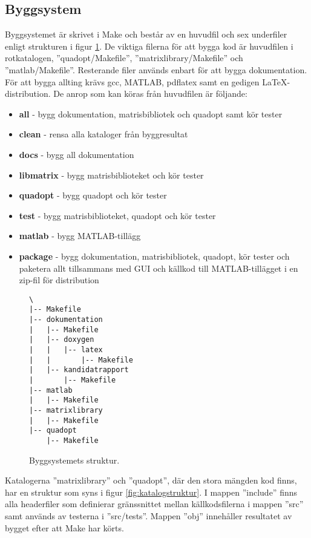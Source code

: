 \subsection{Byggsystem}
Byggsystemet är skrivet i Make och består av en huvudfil och sex underfiler enligt strukturen i figur \ref{fig:byggsystem}. De viktiga filerna för att bygga kod är huvudfilen i rotkatalogen, ''quadopt/Makefile'', ''matrixlibrary/Makefile'' och ''matlab/Makefile''. Resterande filer används enbart för att bygga dokumentation. För att bygga allting krävs gcc, MATLAB, pdflatex samt en gedigen \LaTeX-distribution.
\newline
\newline
De anrop som kan köras från huvudfilen är följande:
\begin{itemize}
  \item \textbf{all} - bygg dokumentation, matrisbibliotek och quadopt samt kör tester
  \item \textbf{clean} - rensa alla kataloger från byggresultat
  \item \textbf{docs} - bygg all dokumentation
  \item \textbf{libmatrix} - bygg matrisbiblioteket och kör tester
  \item \textbf{quadopt} - bygg quadopt och kör tester
  \item \textbf{test} - bygg matrisbiblioteket, quadopt och kör tester
  \item \textbf{matlab} - bygg MATLAB-tillägg
  \item \textbf{package} - bygg dokumentation, matrisbibliotek, quadopt, kör tester och paketera allt tillsammans med GUI och källkod till MATLAB-tillägget i en zip-fil för distribution
\end{itemize}

\begin{figure}[H]
  \centering
  \begin{verbatim}
\
|-- Makefile
|-- dokumentation
|   |-- Makefile
|   |-- doxygen
|   |   |-- latex
|   |       |-- Makefile
|   |-- kandidatrapport
|       |-- Makefile
|-- matlab
|   |-- Makefile
|-- matrixlibrary
|   |-- Makefile
|-- quadopt
    |-- Makefile
  \end{verbatim}
  \caption{Byggsystemets struktur.}
  \label{fig:byggsystem}
\end{figure}

\noindent Katalogerna ''matrixlibrary'' och ''quadopt'', där den stora mängden kod finns, har en struktur som syns i figur \ref{fig:katalogstruktur}. I mappen ''include''  finns alla headerfiler som definierar gränssnittet mellan källkodsfilerna i mappen ''src'' samt används av testerna i ''src/tests''. Mappen ''obj'' innehåller resultatet av bygget efter att Make har körts.


